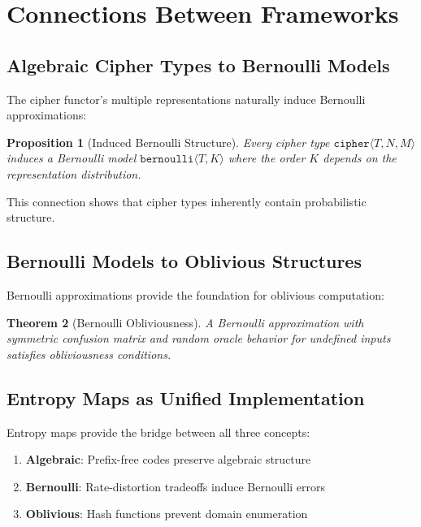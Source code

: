 \documentclass[11pt]{article}
\theoremstyle{definition}
\theoremstyle{plain}
\newtheorem{theorem}{Theorem}[section]
\newtheorem{proposition}[theorem]{Proposition}
\theoremstyle{remark}
\begin{document}
\section{Connections Between Frameworks}
\label{sec:connections}

\subsection{Algebraic Cipher Types to Bernoulli Models}

The cipher functor's multiple representations naturally induce Bernoulli approximations:

\begin{proposition}[Induced Bernoulli Structure]
\label{prop:induced-bernoulli}
Every cipher type $\texttt{cipher}\langle T,N,M \rangle$ induces a Bernoulli model $\texttt{bernoulli}\langle T,K \rangle$ where the order $K$ depends on the representation distribution.
\end{proposition}

This connection shows that cipher types inherently contain probabilistic structure.

\subsection{Bernoulli Models to Oblivious Structures}

Bernoulli approximations provide the foundation for oblivious computation:

\begin{theorem}[Bernoulli Obliviousness]
\label{thm:bernoulli-oblivious}
A Bernoulli approximation with symmetric confusion matrix and random oracle behavior for undefined inputs satisfies obliviousness conditions.
\end{theorem}

\subsection{Entropy Maps as Unified Implementation}

Entropy maps provide the bridge between all three concepts:

\begin{enumerate}
\item \textbf{Algebraic}: Prefix-free codes preserve algebraic structure
\item \textbf{Bernoulli}: Rate-distortion tradeoffs induce Bernoulli errors
\item \textbf{Oblivious}: Hash functions prevent domain enumeration
\end{enumerate}
\end{document}
